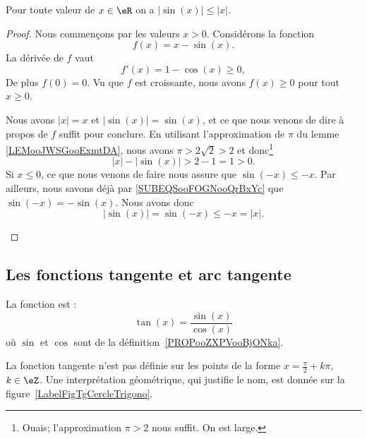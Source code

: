 \begin{lemma}       \label{LEMooIECUooQOGYyN}
	Pour toute valeur de \( x\in \eR\) on a \( |\sin(x)|\leq |x|\).
\end{lemma}

\begin{proof}
	Nous commençons par les valeurs \( x>0\). Considérons la fonction
	\begin{equation}
		f(x)=x-\sin(x).
	\end{equation}
	La dérivée de \( f\) vaut
	\begin{equation}
		f'(x)=1-\cos(x)\geq 0,
	\end{equation}
	De plus \( f(0)=0\). Vu que \( f\) est croissante, nous avons \( f(x)\geq 0\) pour tout \( x\geq 0\).

	\begin{subproof}
		Nous avons \(| x |=x\) et \( | \sin(x) |=\sin(x)\), et ce que nous venons de dire à propos de \( f\) suffit pour conclure.
		En utilisant l'approximation de \( \pi\) du lemme \ref{LEMooJWSGooExmtDA}, nous avons \( \pi>2\sqrt{ 2 }>2\) et donc\footnote{Ouais; l'approximation \( \pi>2\) nous suffit. On est large.}
		\begin{equation}
			| x |-| \sin(x) |>2-1=1>0.
		\end{equation}
		\spitem[Pour \( x<0\)]
		Si \( x\leq 0\), ce que nous venons de faire nous assure que \( \sin(-x)\leq -x\). Par ailleurs, nous savons déjà par \eqref{SUBEQSooFOGNooQrBxYc} que \( \sin(-x)=-\sin(x)\). Nous avons donc
		\begin{equation}
			| \sin(x) |=\sin(-x)\leq -x=| x |.
		\end{equation}
	\end{subproof}
\end{proof}


\subsection{Les fonctions tangente et arc tangente}

\begin{definition}
	La fonction  est :
	\begin{equation}
		\tan(x)=\frac{ \sin(x) }{ \cos(x) }
	\end{equation}
	où \( \sin\) et \( \cos\) sont de la définition~\ref{PROPooZXPVooBjONka}.
\end{definition}
La fonction tangente n'est pas définie sur les points de la forme \( x=\frac{ \pi }{2}+k\pi\), \( k\in \eZ\). Une interprétation géométrique, qui justifie le nom, est donnée sur la figure~\ref{LabelFigTgCercleTrigono}.
\newcommand{\CaptionFigTgCercleTrigono}{Interprétation géométrique de la fonction tangente. La tangente de l'angle \( \theta\) est positive (et un peu plus grande que \( 1\)) tandis que celle de la tangente de l'angle \( \varphi\) est négative.}


